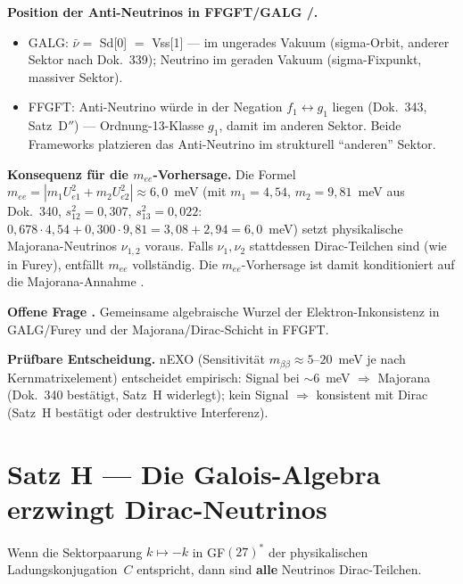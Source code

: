 \textbf{Position der Anti-Neutrinos in FFGFT/GALG \BM/\SM.}
\begin{itemize}
\item GALG: $\bar\nu =$ Sd[0] $=$ Vss[1] --- im ungerades Vakuum (sigma-Orbit,
      anderer Sektor nach Dok.~339); Neutrino im geraden Vakuum (sigma-Fixpunkt,
      massiver Sektor).
\item FFGFT: Anti-Neutrino würde in der Negation $f_1 \leftrightarrow g_1$ liegen
      (Dok.~343, Satz~D$''$) --- Ordnung-13-Klasse $g_1$, damit im anderen Sektor.
      Beide Frameworks platzieren das Anti-Neutrino im strukturell ``anderen'' Sektor.
\end{itemize}

\textbf{Konsequenz für die $m_{ee}$-Vorhersage.}
Die Formel $m_{ee} = |m_1 U_{e1}^2 + m_2 U_{e2}^2| \approx 6{,}0$~meV
(mit $m_1 = 4{,}54$, $m_2 = 9{,}81$~meV aus Dok.~340, $s_{12}^2 = 0{,}307$, $s_{13}^2 = 0{,}022$:
$0{,}678\cdot4{,}54 + 0{,}300\cdot9{,}81 = 3{,}08 + 2{,}94 = 6{,}0$~meV)
setzt physikalische Majorana-Neutrinos $\nu_{1,2}$ voraus. Falls $\nu_1,\nu_2$
stattdessen Dirac-Teilchen sind (wie in Furey), entfällt $m_{ee}$ vollständig.
Die $m_{ee}$-Vorhersage ist damit konditioniert auf die Majorana-Annahme \SM.

\textbf{Offene Frage \SM.} Gemeinsame algebraische Wurzel der Elektron-Inkonsistenz
in GALG/Furey und der Majorana/Dirac-Schicht in FFGFT.

\textbf{Prüfbare Entscheidung.} nEXO (Sensitivität $m_{\beta\beta}\approx5$--$20$~meV je nach Kernmatrixelement) entscheidet empirisch:
Signal bei $\sim6$~meV $\Rightarrow$ Majorana (Dok.~340 bestätigt, Satz~H widerlegt);
kein Signal $\Rightarrow$ konsistent mit Dirac (Satz~H bestätigt oder destruktive Interferenz).

\section{Satz H --- Die Galois-Algebra erzwingt Dirac-Neutrinos}

\begin{theorem}
Wenn die Sektorpaarung $k \mapsto -k$ in GF$(27)^*$ der physikalischen
Ladungskonjugation~$C$ entspricht, dann sind \textbf{alle} Neutrinos
Dirac-Teilchen.
\end{theorem}

